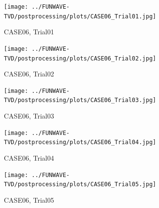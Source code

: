 \documentclass[preprint,10pt]{elsarticle}
\begin{document}
 \begin{figure}
\begin{center}
 \texttt{[image: ../FUNWAVE-TVD/postprocessing/plots/CASE06\_Trial01.jpg]}
 \caption{CASE06, Trial01}
 \label{lineargrid}
 \end{center}
 \end{figure}

\begin{figure}
\begin{center}
 \texttt{[image: ../FUNWAVE-TVD/postprocessing/plots/CASE06\_Trial02.jpg]}
 \caption{CASE06, Trial02}
 \label{lineargrid}
 \end{center}
 \end{figure}

\begin{figure}
\begin{center}
 \texttt{[image: ../FUNWAVE-TVD/postprocessing/plots/CASE06\_Trial03.jpg]}
 \caption{CASE06, Trial03}
 \label{lineargrid}
 \end{center}
 \end{figure}
 
\begin{figure}
\begin{center}
 \texttt{[image: ../FUNWAVE-TVD/postprocessing/plots/CASE06\_Trial04.jpg]}
 \caption{CASE06, Trial04}
 \label{lineargrid}
 \end{center}
 \end{figure}

\begin{figure}
\begin{center}
 \texttt{[image: ../FUNWAVE-TVD/postprocessing/plots/CASE06\_Trial05.jpg]}
 \caption{CASE06, Trial05}
 \label{lineargrid}
 \end{center}
 \end{figure}
\end{document}
